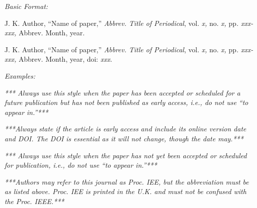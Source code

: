 \documentclass[10pt]{article}
\newcommand*{\guidelabel}[1]{\par\vspace{-4pt}\hspace*{22pt}\textit{#1}\par\vspace{-\parskip}}
\begin{document}
\guidelabel{Basic Format:}
\begin{guideitems}
  \item J. K. Author, “Name of paper,” \textit{Abbrev. Title of Periodical}, vol. \textit{x,} no. \textit{x,} pp\textit{. xxx-xxx,} Abbrev. Month, year.
  \item J. K. Author, “Name of paper,” \textit{Abbrev. Title of Periodical}, vol. \textit{x,} no. \textit{x,} pp\textit{. xxx-xxx,} Abbrev. Month, year, doi: \textit{xxx}.
\end{guideitems}
\guidelabel{Examples:}
\begin{guideitems}
  \item {}
  \item {}
  \item {}
  \item {}
  \item {}
  \item {}
  \item {}
  \item {}
  \item {}
  \item {}
  \item {} \textit{*** Always use this style when the paper has been accepted or scheduled for a future publication but has not been published as early access, i.e., do not use “to appear in.”***}
  \item {} \textit{***Always state if the article is early access and include its online version date and DOI. The DOI is essential as it will not change, though the date may.***}
  \item {} \textit{*** Always use this style when the paper has not yet been accepted or scheduled for publication, i.e., do not use “to appear in.”***}
  \item {}
  \item {}
  \item {}
  \item {} \textit{***Authors may refer to this journal as Proc. IEE, but the abbreviation must be as listed above. Proc. IEE is printed in the U.K. and must not be confused with the Proc. IEEE.***}
  \item {}
\end{guideitems}
\end{document}
